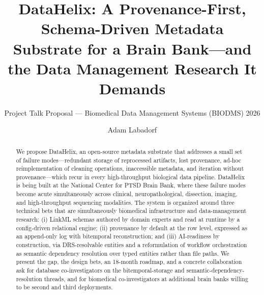 \documentclass[sigconf, nonacm]{acmart}
\begin{document}
\title{DataHelix: A Provenance-First, Schema-Driven Metadata Substrate for a Brain Bank---and the Data Management Research It Demands}
\subtitle{Project Talk Proposal --- Biomedical Data Management Systems (BIODMS) 2026}

\author{Adam Labadorf}

\begin{abstract}
We propose DataHelix, an open-source metadata substrate that addresses a small set of failure modes---redundant storage of reprocessed artifacts, lost provenance, ad-hoc reimplementation of cleaning operations, inaccessible metadata, and iteration without provenance---which recur in every high-throughput biological data pipeline. DataHelix is being built at the National Center for PTSD Brain Bank, where these failure modes become acute simultaneously across clinical, neuropathological, dissection, imaging, and high-throughput sequencing modalities. The system is organized around three technical bets that are simultaneously biomedical infrastructure and data-management research: (i) LinkML schemas authored by domain experts and read at runtime by a config-driven relational engine; (ii) provenance by default at the row level, expressed as an append-only log with bitemporal reconstruction; and (iii) AI-readiness by construction, via DRS-resolvable entities and a reformulation of workflow orchestration as semantic dependency resolution over typed entities rather than file paths. We present the gap, the design bets, an 18-month roadmap, and a concrete collaboration ask for database co-investigators on the bitemporal-storage and semantic-dependency-resolution threads, and for biomedical co-investigators at additional brain banks willing to be second and third deployments.
\end{abstract}

\maketitle
\end{document}
